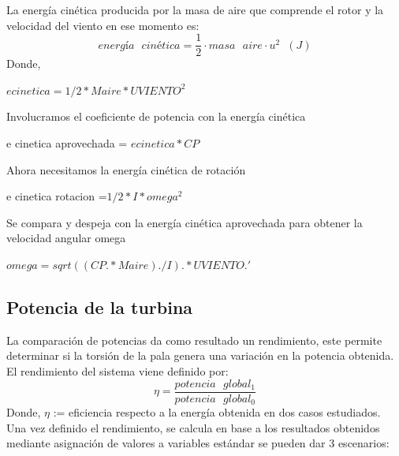 La energía cinética producida por la masa de aire que comprende el rotor y la velocidad del viento en ese momento es:
\begin{equation}
    energía \text{ } cinética = \dfrac{1}{2} \cdot masa \text{ } aire \cdot u^2 \hspace{7pt} (J)
\end{equation}
Donde, 
    
        $e cinetica = 1/2 * M aire * U VIENTO^2$
        
    Involucramos el coeficiente de potencia con la energía cinética
    
         e cinetica aprovechada = $e cinetica * CP$
         
    Ahora necesitamos la energía cinética de rotación
    
         e cinetica rotacion =$ 1/2 * I * omega^2$

    Se compara y despeja con la energía cinética aprovechada para obtener la velocidad angular omega
    
        $omega = sqrt((CP .* M aire)./I) .* U VIENTO.'$



 \subsection{Potencia de la turbina}
 \label{section:rendimiento}
 
La comparación de potencias da como resultado un rendimiento, este permite determinar si la torsión de la pala genera una variación en la potencia obtenida.\\

El rendimiento del sistema viene definido por:
\begin{equation}
  \eta = \dfrac{potencia \text{ } global_1}{potencia \text{ } global_0}  
 \label{def:rendimiento_potencias}
 \end{equation}
  Donde, $\eta$ := eficiencia respecto a la energía obtenida en dos casos estudiados.\\
 
 Una vez definido el rendimiento, se calcula en base a los resultados obtenidos mediante asignación de valores a variables estándar se pueden dar 3 escenarios:
 

